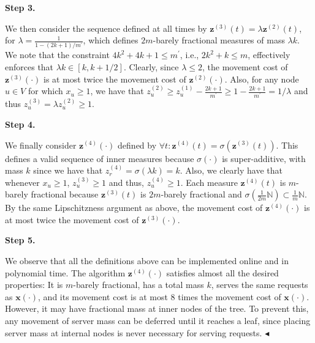 \par\medskip\noindent\textbf{Step 3.}\par




We then consider the sequence defined at all times by ${\mathbf{z}}^{(3)}(t)=\lambda{\mathbf{z}}^{(2)}(t)$, for $\lambda=\frac{1}{1-(2k+1)/m^{\prime}}$, which defines $2m$-barely fractional measures of mass $\lambda k$. We note that the constraint $4k^{2}+4k+1\leq m^{\prime}$, i.e., $2k^{2}+k\leq m$, effectively enforces that $\lambda k\in[k,k+1/2]$. Clearly, since $\lambda\leq 2$, the movement cost of ${\mathbf{z}}^{(3)}(\cdot)$ is at most twice the movement cost of ${\mathbf{z}}^{(2)}(\cdot)$. Also, for any node $u\in V$ for which $x_{u}\geq 1$, we have that $z_{u}^{(2)}\geq z_{u}^{(1)}-\frac{2k+1}{m^{\prime}}\geq 1-\frac{2k+1}{m^{\prime}}=1/\lambda$ and thus $z_{u}^{(3)}=\lambda z_{u}^{(2)}\geq 1$.\par





\par\medskip\noindent\textbf{Step 4.}\par




We finally consider ${\mathbf{z}}^{(4)}(\cdot)$ defined by $\forall t\colon{\mathbf{z}}^{(4)}(t)=\sigma({\mathbf{z}}^{(3)}(t))$. This defines a valid sequence of inner measures because $\sigma(\cdot)$ is super-additive, with mass $k$ since we have that $z^{(4)}_{r}=\sigma\left(\lambda k\right)=k$. Also, we clearly have that whenever $x_{u}\geq 1$, $z^{(3)}_{u}\geq 1$ and thus, $z^{(4)}_{u}\geq 1$. Each measure ${\mathbf{z}}^{(4)}(t)$ is $m$-barely fractional because ${\mathbf{z}}^{(3)}(t)$ is $2m$-barely fractional and $\sigma\left(\frac{1}{2m}\mathbb{N}\right)\subset\frac{1}{m}\mathbb{N}$. By the same Lipschitzness argument as above, the movement cost of ${\mathbf{z}}^{(4)}(\cdot)$ is at most twice the movement cost of ${\mathbf{z}}^{(3)}(\cdot)$.\par





\par\medskip\noindent\textbf{Step 5.}\par




We observe that all the definitions above can be implemented online and in polynomial time. The algorithm ${\mathbf{z}}^{(4)}(\cdot)$ satisfies almost all the desired properties: It is $m$-barely fractional, has a total mass $k$, serves the same requests as ${\boldsymbol{x}}(\cdot)$, and its movement cost is at most $8$ times the movement cost of ${\boldsymbol{x}}(\cdot)$. However, it may have fractional mass at inner nodes of the tree. To prevent this, any movement of server mass can be deferred until it reaches a leaf, since placing server mass at internal nodes is never necessary for serving requests.
$\blacktriangleleft$\par





